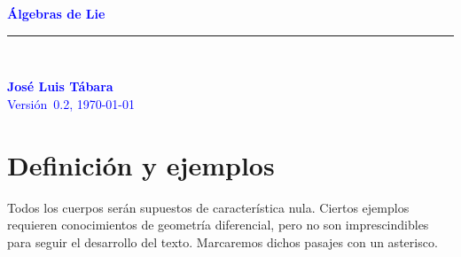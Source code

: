 \documentclass[a4paper,draft,12pt]{article}
\author{José Luis Tábara Carbajo}
\begin{document}
\newlength{\centeroffset}
\setlength{\centeroffset}{-0.5\oddsidemargin}
\addtolength{\centeroffset}{0.4\evensidemargin}
\addtolength{\textwidth}{-\centeroffset}
\thispagestyle{empty}
\noindent\hspace*{\centeroffset}\begin{minipage}{\textwidth}
\flushright
\textcolor{blue}{
{\Huge \bfseries \sf  Álgebras de Lie}
\noindent\rule[-1ex]{\textwidth}{5pt}\\[4.5ex]}
\end{minipage}


\noindent\hspace*{\centeroffset}\begin{minipage}{\textwidth}
\flushright
\textcolor{blue}{
 {\bfseries  
José Luis Tábara\\[1.5ex]} 
Versión~0.2, \today\\} %

\end{minipage}



\newpage


\tableofcontents

\newpage











\section{Definición y ejemplos}




\rhead{\footnotesize \bf  \thepage}
\cfoot{}
\pagestyle{fancy}
\setcounter{page}{1}





 Todos los cuerpos   serán supuestos de característica nula.
Ciertos ejemplos requieren conocimientos de geometría diferencial, pero no son imprescindibles para seguir el desarrollo del texto.  Marcaremos dichos pasajes con un asterisco.
\end{document}
